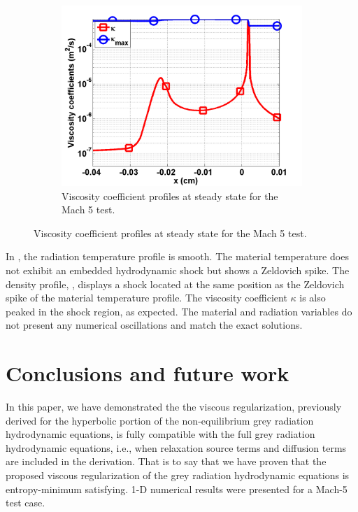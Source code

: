 \documentclass{mc2015}
\begin{document}
\begin{figure}[H]
\begin{subfigure}[b]{0.47\textwidth}
                \centering
                \includegraphics[width=\textwidth]{figs/Mach_5_nel_500_viscosity.png}
        \caption{Viscosity coefficient profiles at steady state for the Mach 5 test.}\label{fig:Mach5_visc}
\end{subfigure}
\end{figure}
%
In , the radiation temperature profile is smooth. The material temperature does not exhibit an embedded hydrodynamic shock but shows a Zeldovich spike. The density profile, , displays a shock located at the same position as the Zeldovich spike of the material temperature profile. The viscosity coefficient $\kappa$ is also peaked in the shock region, as expected. The material and radiation variables do not present any numerical oscillations and match the exact solutions.
%
\section{Conclusions and future work}\label{sec:conclusion}
%
In this paper, we have demonstrated the the viscous regularization, previously derived
for the hyperbolic portion of the non-equilibrium grey radiation hydrodynamic equations,
is fully compatible with the full grey radiation hydrodynamic equations, i.e., when
relaxation source terms and diffusion terms are included in the derivation. That is to say that we have
proven that the proposed viscous regularization of the grey radiation hydrodynamic equations
is entropy-minimum satisfying. 1-D numerical results were presented for a Mach-5 test case.
\end{document}
